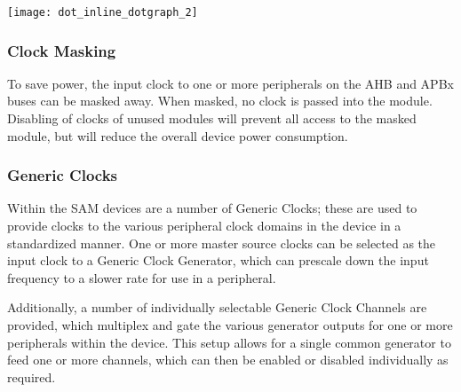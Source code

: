 \label{group__asfdoc__sam0__system__clock__group_asfdoc_sam0_system_clock_module_clock_tree}%
\hypertarget{group__asfdoc__sam0__system__clock__group_asfdoc_sam0_system_clock_module_clock_tree}{}%
\begin{center}

\begin{DoxyImageNoCaption}
  \mbox{\texttt{[image: dot\_inline\_dotgraph\_2]}}
\end{DoxyImageNoCaption}
\end{center}
\hypertarget{group__asfdoc__sam0__system__clock__group_asfdoc_sam0_system_clock_module_overview_clock_masking}{}\subsubsection{Clock Masking}\label{group__asfdoc__sam0__system__clock__group_asfdoc_sam0_system_clock_module_overview_clock_masking}
To save power, the input clock to one or more peripherals on the A\+H\+B and A\+P\+Bx buses can be masked away. When masked, no clock is passed into the module. Disabling of clocks of unused modules will prevent all access to the masked module, but will reduce the overall device power consumption.\hypertarget{group__asfdoc__sam0__system__clock__group_asfdoc_sam0_system_clock_module_overview_gclk}{}\subsubsection{Generic Clocks}\label{group__asfdoc__sam0__system__clock__group_asfdoc_sam0_system_clock_module_overview_gclk}
Within the S\+A\+M devices are a number of Generic Clocks; these are used to provide clocks to the various peripheral clock domains in the device in a standardized manner. One or more master source clocks can be selected as the input clock to a Generic Clock Generator, which can prescale down the input frequency to a slower rate for use in a peripheral.

Additionally, a number of individually selectable Generic Clock Channels are provided, which multiplex and gate the various generator outputs for one or more peripherals within the device. This setup allows for a single common generator to feed one or more channels, which can then be enabled or disabled individually as required.

